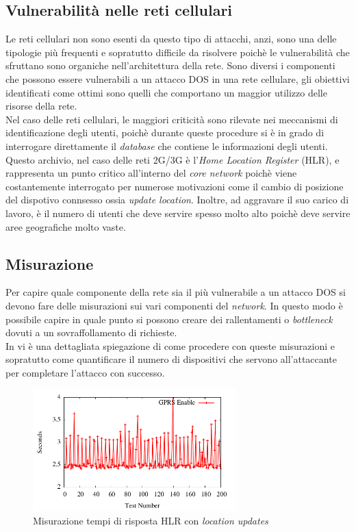 \subsection{Vulnerabilità nelle reti cellulari}
Le reti cellulari non sono esenti da questo tipo di attacchi, anzi, sono una delle tipologie più frequenti e sopratutto difficile da risolvere
poichè le vulnerabilità che sfruttano sono organiche nell'architettura della rete.
Sono diversi i componenti che possono essere vulnerabili a un attacco DOS in una rete cellulare, gli obiettivi identificati come ottimi sono quelli
che comportano un maggior utilizzo delle risorse della rete.\\
Nel caso delle reti cellulari, le maggiori criticità sono rilevate nei meccanismi di identificazione degli utenti, poichè durante queste procedure si
è in grado di interrogare direttamente il \textit{database} che contiene le informazioni degli utenti.
Questo archivio, nel caso delle reti 2G/3G è l'\textit{Home Location Register} (HLR), e rappresenta un punto critico all'interno del \textit{core network}
poichè viene costantemente interrogato per numerose motivazioni come il cambio di posizione del dispotivo connsesso ossia \textit{update location}.
Inoltre, ad aggravare il suo carico di lavoro, è il numero di utenti che deve servire spesso molto alto poichè deve servire aree geografiche molto vaste.

\subsection{Misurazione}
Per capire quale componente della rete sia il più vulnerabile a un attacco DOS si devono fare delle misurazioni sui vari componenti del \textit{network}.
In questo modo è possibile capire in quale punto si possono creare dei rallentamenti o \textit{bottleneck} dovuti a un sovraffollamento di richieste.\\
In \cite{measuring-dos} vi è una dettagliata spiegazione di come procedere con queste misurazioni e sopratutto come quantificare il numero di dispositivi che 
servono all'attaccante per completare l'attacco con successo.

\begin{figure}[h]
    \centering
    \includegraphics[width=0.7\textwidth]{images/hlr-measuring.png}
    \caption{Misurazione tempi di risposta HLR con \textit{location updates}\cite{measuring-dos}}
\end{figure}